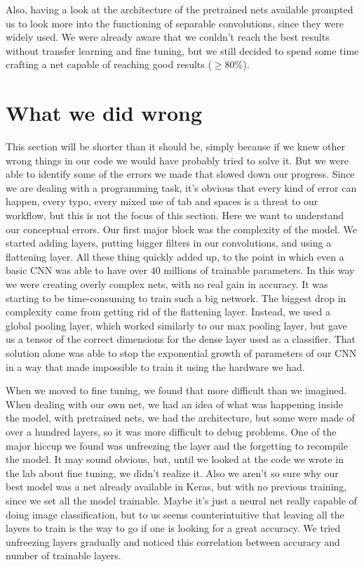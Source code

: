 \documentclass[a4paper,11pt]{article}
\numberwithin{equation}{section}
\begin{document}
Also, having a look at the architecture of the pretrained nets available prompted us to look more into the functioning of separable convolutions, since they were widely used. We were already aware that we couldn't reach the best results without transfer learning and fine tuning, but we still decided to spend some time crafting a net capable of reaching good results (\(\geq 80\%\)).
\section*{What we did wrong}
This section will be shorter than it should be, simply because if we knew other wrong things in our code we would have probably tried to solve it. But we were able to identify some of the errors we made that slowed down our progress. Since we are dealing with a programming task, it's obvious that every kind of error can happen, every typo, every mixed use of tab and spaces is a threat to our workflow, but this is not the focus of this section. Here we want to understand our conceptual errors. Our first major block was the complexity of the model. We started adding layers, putting bigger filters in our convolutions, and using a flattening layer. All these thing quickly added up, to the point in which even a basic CNN was able to have over \(40\) millions of trainable parameters. In this way we were creating overly complex nets, with no real gain in accuracy. It was starting to be time-consuming to train such a big network. The biggest drop in complexity came from getting rid of the flattening layer. Instead, we used a global pooling layer, which worked similarly to our max pooling layer, but gave us a tensor of the correct dimensions for the dense layer used as a classifier. That solution alone was able to stop the exponential growth of parameters of our CNN in a way that made impossible to train it using the hardware we had. 

When we moved to fine tuning, we found that more difficult than we imagined. When dealing with our own net, we had an idea of what was happening inside the model, with pretrained nets, we had the architecture, but some were made of over a hundred layers, so it was more difficult to debug problems. One of the major hiccup we found was unfreezing the layer and the forgetting to recompile the model. It may sound obvious, but, until we looked at the code we wrote in the lab about fine tuning, we didn't realize it. Also we aren't so sure why our best model was a net already available in Keras, but with no previous training, since we set all the model trainable. Maybe it's just a neural net really capable of doing image classification, but to us seems counterintuitive that leaving all the layers to train is the way to go if one is looking for a great accuracy. We tried unfreezing layers gradually and noticed this correlation between accuracy and number of trainable layers.
\end{document}
